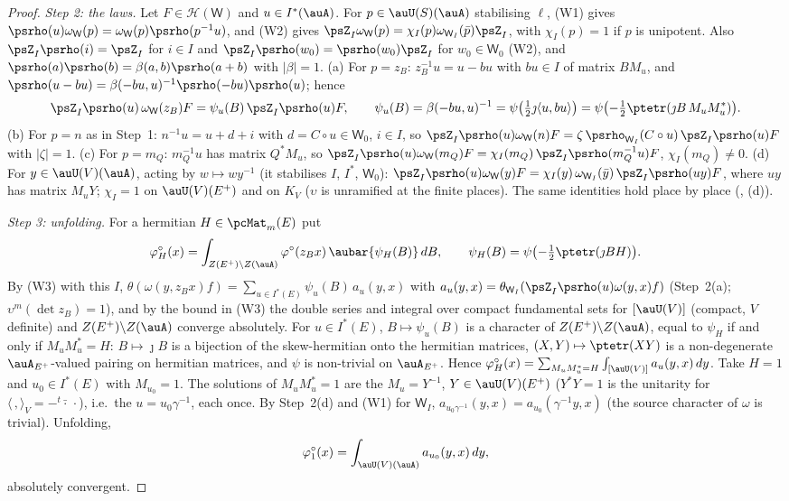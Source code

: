 \documentclass[10pt]{amsart}
\theoremstyle{definition}
\theoremstyle{remark}
\providecommand{\psHS}{\mathcal H}
\begin{document}
\begin{proof}
\emph{Step 2: the laws.} Let $F\in\psHS(\mathsf W)$ and $u\in I^*(\auA)$. For $p\in\auU(S)(\auA)$ stabilising
$\ell$, (W1) gives $\psrho(u)\omega_{\mathsf W}(p)=\omega_{\mathsf W}(p)\psrho(p^{-1}u)$, and (W2) gives
$\psZ_I\omega_{\mathsf W}(p)=\chi_I(p)\omega_{\mathsf W_I}(\bar p)\psZ_I$, with $\chi_I(p)=1$ if $p$ is
unipotent. Also $\psZ_I\psrho(i)=\psZ_I$ for $i\in I$ and $\psZ_I\psrho(w_0)=\psrho(w_0)\psZ_I$ for
$w_0\in\mathsf W_0$ (W2), and $\psrho(a)\psrho(b)=\beta(a,b)\psrho(a+b)$ with $|\beta|=1$.
(a) For $p=z_B$: $z_B^{-1}u=u-bu$ with $bu\in I$ of matrix $BM_u$, and
$\psrho(u-bu)=\beta(-bu,u)^{-1}\psrho(-bu)\psrho(u)$; hence
\[
\psZ_I\psrho(u)\,\omega_{\mathsf W}(z_B)F=\psi_u(B)\,\psZ_I\psrho(u)F,\qquad
\psi_u(B)=\beta(-bu,u)^{-1}=\psi\bigl(\tfrac12\jmath\langle u,bu\rangle\bigr)=\psi\bigl(-\tfrac12\ptetr(\jmath B\,M_uM_u^*)\bigr).
\]
(b) For $p=n$ as in Step~1: $n^{-1}u=u+d+i$ with $d=C\circ u\in\mathsf W_0$, $i\in I$, so
$\psZ_I\psrho(u)\omega_{\mathsf W}(n)F=\zeta\,\psrho_{\mathsf W_I}(C\circ u)\,\psZ_I\psrho(u)F$ with
$|\zeta|=1$. (c) For $p=m_Q$: $m_Q^{-1}u$ has matrix $Q^*M_u$, so $\psZ_I\psrho(u)\omega_{\mathsf W}(m_Q)F
=\chi_I(m_Q)\,\psZ_I\psrho(m_Q^{-1}u)F$, $\chi_I(m_Q)\ne0$. (d) For $y\in\auU(V)(\auA)$, acting by $w\mapsto
wy^{-1}$ (it stabilises $I$, $I^*$, $\mathsf W_0$): $\psZ_I\psrho(u)\omega_{\mathsf W}(y)F=\chi_I(y)\,
\omega_{\mathsf W_I}(\bar y)\,\psZ_I\psrho(uy)F$, where $uy$ has matrix $M_uY$; $\chi_I=1$ on
$\auU(V)(E^+)$ and on $K_V$ ($\upsilon$ is unramified at the finite places). The same identities hold place
by place ({\cite[Proposition~2.14(c)]{P49}}, (d)).

\emph{Step 3: unfolding.} For a hermitian $H\in\pcMat_m(E)$ put
\begin{equation}\label{pte:eq-coeff}
\varphi^\circ_H(x)=\int_{Z(E^+)\backslash Z(\auA)}\varphi^\circ(z_Bx)\,\aubar{\psi_H(B)}\,dB,\qquad
\psi_H(B)=\psi\bigl(-\tfrac12\ptetr(\jmath BH)\bigr).
\end{equation}
By (W3) with this $I$, $\theta(\omega(y,z_Bx)f)=\sum_{u\in I^*(E)}\psi_u(B)\,a_u(y,x)$ with
$a_u(y,x)=\theta_{\mathsf W_I}(\psZ_I\psrho(u)\omega(y,x)f)$ (Step~2(a); $\upsilon^m(\det z_B)=1$), and by the
bound in (W3) the double series and integral over compact fundamental sets for $[\auU(V)]$ (compact, $V$
definite) and $Z(E^+)\backslash Z(\auA)$ converge absolutely. For $u\in I^*(E)$, $B\mapsto\psi_u(B)$ is a
character of $Z(E^+)\backslash Z(\auA)$, equal to $\psi_H$ if and only if $M_uM_u^*=H$: $B\mapsto\jmath B$ is a
bijection of the skew-hermitian onto the hermitian matrices, $(X,Y)\mapsto\ptetr(XY)$ is a non-degenerate
$\auA_{E^+}$-valued pairing on hermitian matrices, and $\psi$ is non-trivial on $\auA_{E^+}$. Hence
$\varphi^\circ_H(x)=\sum_{M_uM_u^*=H}\int_{[\auU(V)]}a_u(y,x)\,dy$. Take $H=1$ and $u_0\in I^*(E)$ with
$M_{u_0}=1$. The solutions of $M_uM_u^*=1$ are the $M_u=Y^{-1}$, $Y\in\auU(V)(E^+)$ ($Y^*Y=1$ is the
unitarity for $\langle\,,\rangle_V=-{}^t\bar\cdot\,\cdot$), i.e.\ the $u=u_0\gamma^{-1}$, each once. By
Step~2(d) and (W1) for $\mathsf W_I$, $a_{u_0\gamma^{-1}}(y,x)=a_{u_0}(\gamma^{-1}y,x)$ (the source character of
$\omega$ is trivial). Unfolding,
\[
\varphi^\circ_1(x)=\int_{\auU(V)(\auA)}a_{u_0}(y,x)\,dy,
\]
absolutely convergent.


\end{proof}
\end{document}
